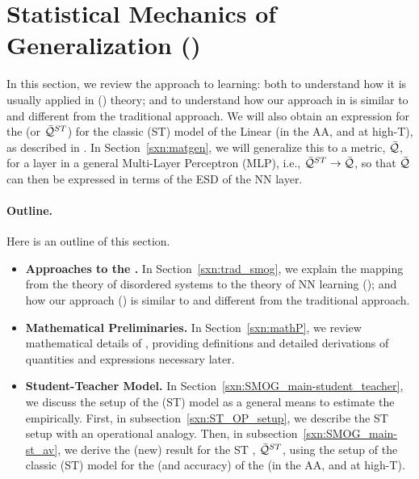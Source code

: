 \section{Statistical Mechanics of Generalization (\SMOG)}
\label{sxn:SMOG_main}

In this section, we review the \STATMECH approach to learning: 
both to understand how it is usually applied in \StatisticalMechanicsOfGeneralization (\SMOG) theory; 
and to understand how our \SemiEmpirical approach in \SETOL is similar to and different from the traditional approach.
We will also obtain an expression for the \GeneralizationAccuracy (or \ModelQuality $\bar{\mathcal{Q}}^{ST}$) for the
classic \StudentTeacher (ST) model of the Linear \Perceptron (in the AA, and at high-T),
as described in \cite{SST90,SST92}.
In Section~\ref{sxn:matgen}, we will generalize this to a \LayerQuality metric, $\bar{\mathcal{Q}}$, for a layer in a general Multi-Layer Perceptron (MLP),
i.e., $\bar{\mathcal{Q}}^{ST}\rightarrow\bar{\mathcal{Q}}$, so that $\bar{\mathcal{Q}}$ can then be expressed in terms of the ESD of the NN layer.

\paragraph{Outline.}
Here is an outline of this section.
\begin{itemize} %
\item
  \textbf{Approaches to the \SMOG.}
  In Section~\ref{sxn:trad_smog}, we explain the mapping from the \STATMECH theory of disordered systems
    to the \STATMECH theory of NN learning (\SMOG); and how our \SemiEmpirical approach (\SETOL)
    is similar to and different from the traditional approach.

  \item
      \textbf{Mathematical Preliminaries.}
    In Section~\ref{sxn:mathP}, we review mathematical details of \STATMECH, providing definitions
      and detailed derivations of quantities and expressions necessary later.  

    \item
      \textbf{Student-Teacher Model.}
      In Section~\ref{sxn:SMOG_main-student_teacher}, we discuss the setup of the \StudentTeacher (ST) model
      as a general means to estimate the \AverageGeneralizationError empirically.
      First, in subsection~\ref{sxn:ST_OP_setup}, we describe the ST setup with an operational analogy.
       Then, in subsection~\ref{sxn:SMOG_main-st_av}, we derive the (new) result for the
    ST \ModelQuality, $\bar{\mathcal{Q}}^{ST}$, using the setup of the classic (ST) model for the
    \GeneralizationError (and accuracy) of the \Perceptron (in the AA, and at high-T).
\end{itemize} %

